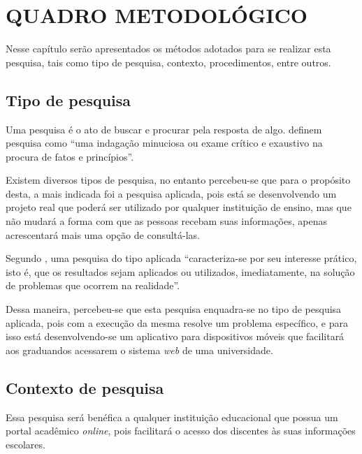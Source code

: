 \chapter{QUADRO METODOLÓGICO}

	\par Nesse capítulo serão apresentados os métodos adotados para se realizar esta
pesquisa, tais como tipo de pesquisa, contexto, procedimentos, entre outros.

\section{Tipo de pesquisa}
	
	\par Uma pesquisa é o ato de buscar e procurar pela resposta de algo.
 definem pesquisa como “uma indagação minuciosa
ou exame crítico e exaustivo na procura de fatos e princípios”.

	\par Existem diversos tipos de pesquisa, no entanto percebeu-se que para o
propósito desta, a mais indicada foi a pesquisa aplicada, pois está se
desenvolvendo um projeto real que poderá ser utilizado por qualquer instituição
de ensino, mas que não mudará a forma com que as pessoas recebam suas
informações, apenas acrescentará mais uma opção de consultá-las.

	\par Segundo , uma pesquisa do tipo aplicada
“caracteriza-se por seu interesse prático, isto é, que os resultados sejam
aplicados ou utilizados, imediatamente, na solução de problemas que ocorrem na
realidade”.

	\par Dessa maneira, percebeu-se que esta pesquisa enquadra-se no tipo de pesquisa
aplicada, pois com a execução da mesma resolve um problema específico, e para
isso está desenvolvendo-se um aplicativo para dispositivos móveis que facilitará aos
graduandos acessarem o sistema \textit{web} de uma universidade.

\section{Contexto de pesquisa}

	\par Essa pesquisa será benéfica a qualquer instituição educacional que possua
um portal acadêmico \textit{online}, pois facilitará o acesso dos discentes às suas
informações escolares.

